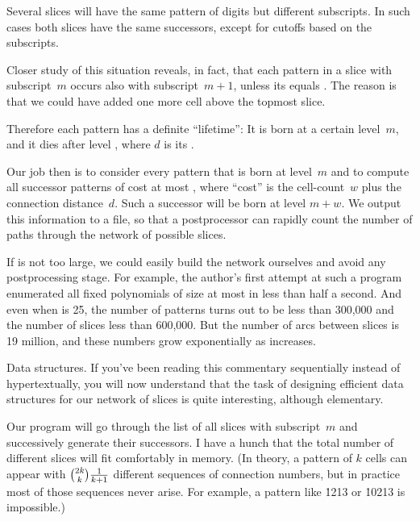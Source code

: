 \fi

Several slices will have the same pattern of digits but
different
subscripts. In such cases both slices have the same successors, except for
cutoffs based on the subscripts.

Closer study of this situation reveals, in fact, that each pattern in a slice
with subscript~$m$ occurs also with subscript~$m+1$, unless its
 equals . The reason is that we could
have added one
more cell above the topmost slice.

Therefore each pattern has a definite ``lifetime'': It is born at a certain
level~$m$, and it dies after level , where $d$ is its
.

Our job then is to consider every pattern that is born at level~$m$ and to
compute all successor patterns of cost at most , where
``cost'' is the
cell-count~$w$ plus the connection distance~$d$. Such a successor will be born
at level $m+w$. We output this information to a file, so that a postprocessor
can rapidly count the number of paths through the network of possible slices.

If  is not too large, we could easily build the network ourselves
and
avoid any postprocessing stage. For example, the author's first attempt at
such a program enumerated all fixed polynomials of size at most 
in less than half a second. And even when  is 25, the
number of patterns turns out to be less than 300,000 and the number of
slices less than 600,000. But the number of arcs between slices is
19 million, and these numbers grow exponentially as  increases.

\fi

Data structures. If you've been reading this
commentary sequentially instead
of hypertextually, you will now understand that the task of designing
efficient data structures for our network of slices is
quite interesting, although elementary.

Our program will go through the list of all slices with subscript~$m$ and
successively generate their successors. I have a hunch that the total number
of different slices will fit comfortably in memory. (In theory, a pattern
of $k$ cells can appear with ${2k\choose k}{1\over k+1}$ different sequences
of connection numbers, but in practice most of those sequences never arise. For
example, a pattern like \.{1213} or \.{10213} is impossible.)

